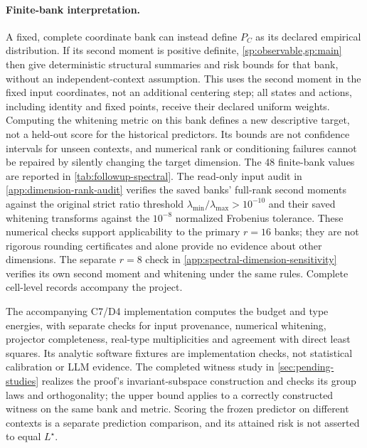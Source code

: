 \paragraph{Finite-bank interpretation.}
\label{sp:finite-bank}
A fixed, complete coordinate bank can instead define $P_C$ as its declared empirical distribution. If its second moment is positive definite, \cref{sp:observable,sp:main} then give deterministic structural summaries and risk bounds for that bank, without an independent-context assumption. This uses the second moment in the fixed input coordinates, not an additional centering step; all states and actions, including identity and fixed points, receive their declared uniform weights. Computing the whitening metric on this bank defines a new descriptive target, not a held-out score for the historical predictors. Its bounds are not confidence intervals for unseen contexts, and numerical rank or conditioning failures cannot be repaired by silently changing the target dimension. The 48 finite-bank values are reported in \cref{tab:followup-spectral}. The read-only input audit in \cref{app:dimension-rank-audit} verifies the saved banks' full-rank second moments against the original strict ratio threshold $\lambda_{\min}/\lambda_{\max}>10^{-10}$ and their saved whitening transforms against the $10^{-8}$ normalized Frobenius tolerance. These numerical checks support applicability to the primary $r=16$ banks; they are not rigorous rounding certificates and alone provide no evidence about other dimensions. The separate $r=8$ check in \cref{app:spectral-dimension-sensitivity} verifies its own second moment and whitening under the same rules. Complete cell-level records accompany the project.

The accompanying C7/D4 implementation computes the budget and type energies, with separate checks for input provenance, numerical whitening, projector completeness, real-type multiplicities and agreement with direct least squares. Its analytic software fixtures are implementation checks, not statistical calibration or LLM evidence. The completed witness study in \cref{sec:pending-studies} realizes the proof's invariant-subspace construction and checks its group laws and orthogonality; the upper bound applies to a correctly constructed witness on the same bank and metric. Scoring the frozen predictor on different contexts is a separate prediction comparison, and its attained risk is not asserted to equal $L^\star$.
